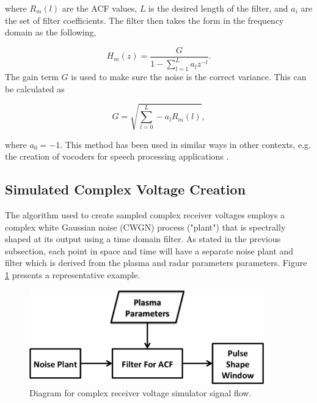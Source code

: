 \documentclass[draft,ras]{agutex}
\begin{document}
\begin{article}
\noindent where $R_m(l)$ are the ACF values, $L$ is the desired length of the filter, and $ a_i$ are the set of filter coefficients. The filter then takes the form in the frequency domain as the following,

\begin{equation}
\label{eq:filtz}
H_m(z) = \frac{G}{1-\displaystyle \sum_{l=1}^{L} a_l z^{-l}}.
\end{equation}
\noindent The gain term $G$ is used to make sure the noise is the correct variance. This can be calculated as 

\begin{equation}
\label{eq:gainterm}
G=\sqrt{\displaystyle \sum_{l=0}^L -a_l R_m(l)},
\end{equation}

\noindent where $a_0=-1$.  This method has been used in similar ways in other contexts, e.g. the creation of vocoders for speech processing applications \citep{rabinerdigitalspeech}.

\subsection{Simulated Complex Voltage Creation}

The algorithm used to create sampled complex receiver voltages employs a complex white Gaussian noise (CWGN) process ("plant") that is spectrally shaped at its output using a time domain filter. As stated in the previous subsection, each point in space and time will have a separate noise plant and filter which is derived from the plasma and radar parameters parameters.  Figure \ref{fig:IQdiagram} presents a representative example. 

\begin{figure}[h!]
\centering
\includegraphics[width=4in]{diagrampart}
\caption{Diagram for complex receiver voltage simulator signal flow.}
\label{fig:IQdiagram}
\end{figure}


\end{article}
\end{document}
